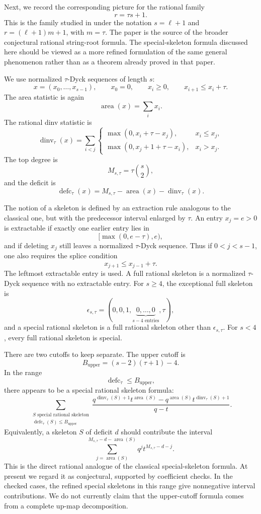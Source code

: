 \documentclass[11pt]{article}
\newcommand{\area}{\operatorname{area}}
\newcommand{\dinv}{\operatorname{dinv}}
\newcommand{\defc}{\operatorname{defc}}
\begin{document}
Next, we record the corresponding picture for the rational family
\[
  r=\tau s+1.
\]
This is the family studied in \cite{Hawkes2022} under the notation
\(s=\ell+1\) and \(r=(\ell+1)m+1\), with \(m=\tau\).  The paper
\cite{Hawkes2022} is the source of the broader conjectural rational
string-root formula.  The special-skeleton formula discussed here should be
viewed as a more refined formulation of the same general phenomenon rather than
as a theorem already proved in that paper.

We use normalized \(\tau\)-Dyck sequences of length \(s\):
\[
  x=(x_0,\ldots,x_{s-1}),\qquad
  x_0=0,\qquad x_i\ge0,\qquad x_{i+1}\le x_i+\tau.
\]
The area statistic is again
\[
  \area(x)=\sum_i x_i.
\]
The rational dinv statistic is
\[
\dinv_\tau(x)=\sum_{i<j}
\begin{cases}
\max(0,x_i+\tau-x_j), & x_i\le x_j,\\
\max(0,x_j+1+\tau-x_i), & x_i>x_j.
\end{cases}
\]
The top degree is
\[
  M_{s,\tau}=\tau\binom{s}{2},
\]
and the deficit is
\[
  \defc_\tau(x)=M_{s,\tau}-\area(x)-\dinv_\tau(x).
\]

The notion of a skeleton is defined by an extraction rule analogous to the
classical one, but with the predecessor interval enlarged by \(\tau\).  An
entry \(x_j=e>0\) is extractable if exactly one earlier entry lies in
\[
  [\max(0,e-\tau),e),
\]
and if deleting \(x_j\) still leaves a normalized \(\tau\)-Dyck sequence.  Thus
if \(0<j<s-1\), one also requires the splice condition
\[
  x_{j+1}\le x_{j-1}+\tau.
\]
The leftmost extractable entry is used.  A full rational skeleton is a
normalized \(\tau\)-Dyck sequence with no extractable entry.  For \(s\ge4\),
the exceptional full skeleton is
\[
  \epsilon_{s,\tau}
  =(0,0,1,\underbrace{0,\ldots,0}_{s-4\text{ entries}},\tau),
\]
and a special rational skeleton is a full rational skeleton other than
\(\epsilon_{s,\tau}\).  For \(s<4\), every full rational skeleton is special.

There are two cutoffs to keep separate.  The upper cutoff is
\[
  B_{\mathrm{upper}}=(s-2)(\tau+1)-4.
\]
In the range
\[
  \defc_\tau\le B_{\mathrm{upper}},
\]
there appears to be a special rational skeleton formula:
\[
\sum_{\substack{
S\text{ special rational skeleton}\\
\defc_\tau(S)\le B_{\mathrm{upper}}
}}
\frac{
q^{\dinv_\tau(S)+1}t^{\area(S)}
-
q^{\area(S)}t^{\dinv_\tau(S)+1}
}{q-t}.
\]
Equivalently, a skeleton \(S\) of deficit \(d\) should contribute the interval
\[
  \sum_{j=\area(S)}^{M_{s,\tau}-d-\area(S)}
  q^j t^{M_{s,\tau}-d-j}.
\]
This is the direct rational analogue of the classical special-skeleton
formula.  At present we regard it as conjectural, supported by coefficient
checks.  In the checked cases, the refined special skeletons in this range give
nonnegative interval contributions.  We do not currently claim that the
upper-cutoff formula comes from a complete up-map decomposition.
\end{document}
